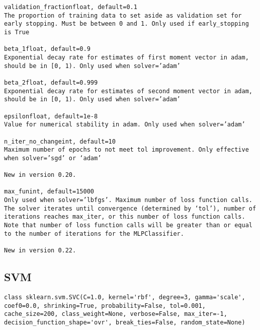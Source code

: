 \documentclass[12pt]{article}
\begin{document}
\begin{verbatim}
validation_fractionfloat, default=0.1
The proportion of training data to set aside as validation set for early stopping. Must be between 0 and 1. Only used if early_stopping is True

beta_1float, default=0.9
Exponential decay rate for estimates of first moment vector in adam, should be in [0, 1). Only used when solver=’adam’

beta_2float, default=0.999
Exponential decay rate for estimates of second moment vector in adam, should be in [0, 1). Only used when solver=’adam’

epsilonfloat, default=1e-8
Value for numerical stability in adam. Only used when solver=’adam’

n_iter_no_changeint, default=10
Maximum number of epochs to not meet tol improvement. Only effective when solver=’sgd’ or ‘adam’

New in version 0.20.

max_funint, default=15000
Only used when solver=’lbfgs’. Maximum number of loss function calls. The solver iterates until convergence (determined by ‘tol’), number of iterations reaches max_iter, or this number of loss function calls. Note that number of loss function calls will be greater than or equal to the number of iterations for the MLPClassifier.

New in version 0.22.
\end{verbatim}
\newpage
\subsection{SVM}
\begin{lstlisting}
class sklearn.svm.SVC(C=1.0, kernel='rbf', degree=3, gamma='scale', coef0=0.0, shrinking=True, probability=False, tol=0.001, cache_size=200, class_weight=None, verbose=False, max_iter=-1, decision_function_shape='ovr', break_ties=False, random_state=None)
\end{lstlisting}
\end{document}
